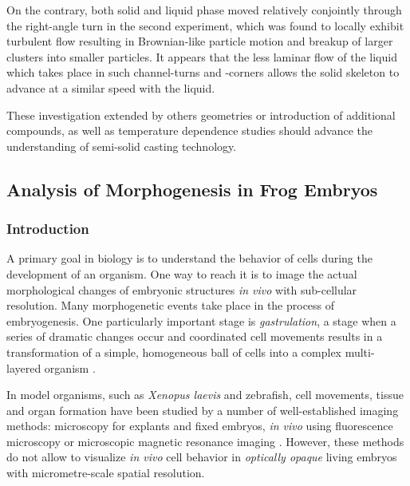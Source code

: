 On the contrary, both solid and liquid phase moved relatively conjointly through the right-angle turn in the second experiment, which was found to locally exhibit turbulent flow resulting in Brownian-like particle motion and breakup of larger clusters into smaller particles. It appears that the less laminar flow of the liquid which takes place in such channel-turns and -corners allows the solid skeleton to advance at a similar speed with the liquid. 

These investigation extended by others geometries or introduction of additional compounds, as well as temperature dependence studies should advance the understanding of semi-solid casting technology.  









\subsection{Analysis of Morphogenesis in Frog Embryos}

\subsubsection{Introduction}

A primary goal in biology is to understand the behavior of cells during the development of an organism. One way to reach it is to image the actual morphological changes of embryonic structures \textit{in vivo} with sub-cellular resolution. Many morphogenetic events take place in the process of embryogenesis. One particularly important stage is \textit{gastrulation}, a stage when a series of dramatic changes occur and coordinated cell movements results in a transformation of a simple, homogeneous ball of cells into a complex multi-layered organism \cite{Keller03}. 

In model organisms, such as \textit{Xenopus laevis} and zebrafish, cell movements, tissue and organ formation have been studied by a number of well-established imaging methods: microscopy for explants and fixed embryos, \textit{in vivo} using fluorescence microscopy \cite{Keller08, Huisken09} or microscopic magnetic resonance imaging \cite{Papan07}. However, these methods do not allow to visualize \textit{in vivo} cell behavior in \textit{optically opaque} living embryos with micrometre-scale spatial resolution. 

